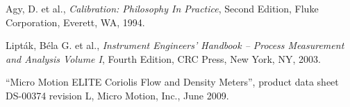 
\noindent
Agy, D. et al., \textit{Calibration: Philosophy In Practice}, Second Edition, Fluke Corporation, Everett, WA, 1994.

\vskip 10pt

\noindent
Lipt\'ak, B\'ela G. et al., \textit{Instrument Engineers' Handbook -- Process Measurement and Analysis Volume I}, Fourth Edition, CRC Press, New York, NY, 2003.

\vskip 10pt

\noindent
``Micro Motion ELITE Coriolis Flow and Density Meters'', product data sheet DS-00374 revision L, Micro Motion, Inc., June 2009.














